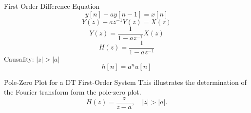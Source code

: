 \begin{frame}{First-Order Difference Equation}
    \begin{equation*}
        y[n] - ay[n-1] = x[n]
    \end{equation*}
    \pause
    {
        \begin{equation*}
            Y(z) - az^{-1}Y(z) = X(z)
        \end{equation*}
        \pause
        \begin{equation*}
            Y(z) = \frac{1}{1 - az^{-1}} X(z)
        \end{equation*}
        \pause
        \begin{equation*}
            H(z) = \frac{1}{1 - az^{-1}}
        \end{equation*}
        Causality: \pause $|z|>|a|$
        \pause
        \begin{equation*}
            h[n] = a^nu[n]
        \end{equation*}
    }
\end{frame}


\begin{frame}{Pole-Zero Plot for a DT First-Order System}
    This illustrates the determination of the Fourier transform form the pole-zero plot.
    \begin{equation*}
        H(z) = \frac{z}{z-a}, \quad |z| >|a|.
    \end{equation*}
    {
        \begin{center}
            
        \end{center}
    }
\end{frame}

\begin{frame}
    {
        \begin{center}
            
        \end{center}
    }
\end{frame}

